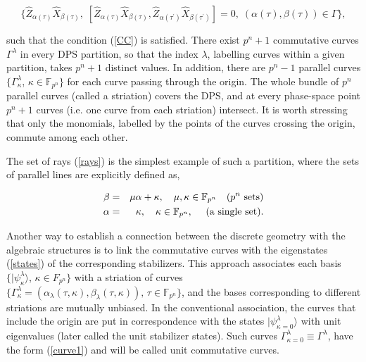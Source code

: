 \documentclass[quantumrep,article,submit,pdftex,moreauthors]{Definitions/mdpi}
\begin{document}
\begin{equation}
  \{\hat{Z}_{\alpha (\tau )}\hat{X}_{\beta (\tau )}, \;
  [\hat{Z}_{\alpha(\tau)} \hat{X}_{\beta (\tau )},
  \hat{Z}_{\alpha (\tau ^{\prime })}\hat{X}_{\beta(\tau^{\prime })}]
  = 0, \; \left( \alpha (\tau ),\beta (\tau )\right) \in \Gamma \},
\end{equation}

{\color{teal} such that the condition (\ref{CC}) is satisfied. There
exist $p^{n}+1$ commutative curves $\Gamma^{\lambda }$ in every DPS partition,
so that the index $\lambda$, labelling curves within a given partition, takes
$p^{n}+1$ distinct values.} In addition, there are $p^{n}-1$ parallel curves
$\{\Gamma _{\kappa }^{\lambda}$, $\kappa \in \mathbb{F}_{p^{n}}\}$ for each
curve passing through the origin.  The whole bundle of $p^{n}$ parallel curves
(called a striation) covers the DPS, {\color{teal} and at every phase-space
  point $p^{n}+1$ curves (i.e.  one curve from each striation) intersect. It is
worth stressing that only the monomials, labelled by the points of the curves
crossing the origin, commute among each other.}

The set of rays (\ref{rays}) is the simplest example of such a partition, where
the sets of parallel lines are explicitly defined as,

\begin{eqnarray}
  \beta
  &=& \mu \alpha + \kappa, \quad \mu, \kappa \in \mathbb{F}_{p^{n}}
  \quad \text{($p^{n}$ sets)}
  \label{rays0} \\
  \alpha
  &=& \kappa, \quad \kappa \in \mathbb{F}_{p^{n}},
  \quad \text{ (a single set).}
  \notag
\end{eqnarray}

Another way to establish a connection between the discrete geometry with the
algebraic structures is to link the commutative curves with the eigenstates
(\ref{states}) of the corresponding stabilizers. This approach associates each
basis $\{|\psi _{\kappa }^{\lambda }\rangle $, $\kappa \in F_{p^{n}}\}$ with a
striation of curves $\{\Gamma_{\kappa }^{\lambda } = \left( \alpha_{\lambda
}(\tau ,\kappa ),\beta_{\lambda }(\tau ,\kappa )\right) ,\,\tau \in
\mathbb{F}_{p^{n}}\}$, and the bases corresponding to different striations are
mutually unbiased. In the conventional association, the curves that include the
origin are put in correspondence with the states $|\psi_{\kappa = 0}^{\lambda
}\rangle $ with unit eigenvalues (later called the unit stabilizer states). Such
curves $\Gamma_{\kappa =0}^{\lambda }\equiv \Gamma^{\lambda }$, have the form
(\ref{curve1}) and will be called unit commutative curves. 
\end{document}

